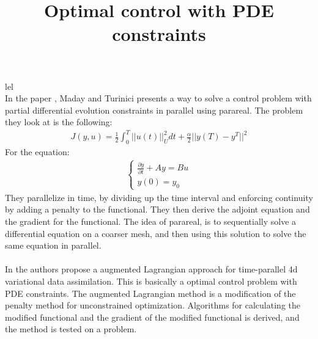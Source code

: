 \documentclass[11pt,a4paper]{article}
\title{Optimal control with PDE constraints}
\begin{document}
\maketitle
\tableofcontents
{}


lel\cite{maday2002parareal,rao2016time,rao2014adjoint, deng2016parallel,comas2005time }
\\
In the paper \cite{maday2002parareal}, Maday and Turinici presents a way to solve a control problem with partial differential evolution constraints in parallel using parareal. The problem they look at is the following:
\begin{align*}
J(y,u) = \frac{1}{2}\int_0^T||u(t)||_U^2dt + \frac{\alpha}{2}||y(T)-y^T||^2
\end{align*} 
For the equation:
\begin{align*}
\left\{
     \begin{array}{lr}
       	\frac{\partial y}{\partial t}+Ay = Bu\\
       	   y(0)=y_0
     \end{array}
   \right.
\end{align*}
They parallelize in time, by dividing up the time interval and enforcing continuity by adding a penalty to the functional. They then derive the adjoint equation and the gradient for the functional. The idea of parareal, is to sequentially solve a differential equation on a coarser mesh, and then using this solution to solve the same equation in parallel. 
\\
\\
In \cite{rao2016time} the authors propose a augmented Lagrangian approach for time-parallel 4d variational data assimilation. This is basically a optimal control problem with PDE constraints. The augmented Lagrangian method is a modification of the penalty method for unconstrained optimization. Algorithms for calculating the modified functional and the gradient of the modified functional is derived, and the method is tested on a problem.    
\end{document}
